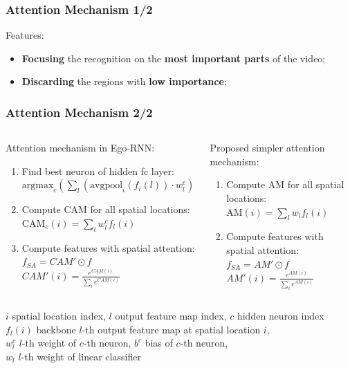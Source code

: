 \documentclass{beamer}
\begin{document}
\begin{frame}
\frametitle{Attention Mechanism 1/2}

Features:
\begin{itemize}
\item \textbf{Focusing} the recognition on the \textbf{most important parts} of the video;
\item \textbf{Discarding} the regions with \textbf{low importance};
\end{itemize}

\end{frame}

\begin{frame}
\frametitle{Attention Mechanism 2/2}

\begin{columns}[t]
	\begin{column}{0.5\textwidth}
		Attention mechanism in Ego-RNN:
		\vspace{6pt}
		{ \scriptsize
		\begin{enumerate}
			\item Find best neuron of hidden fc layer:
			${{\text{argmax}}_c (\sum_l(\text{avgpool}_i(f_i(l)) \cdot w_l^c) + b^c )}$
			\item Compute CAM for all spatial locations: 
			${\text{CAM}_c(i) = \sum_l w_l^c f_l(i)}$
			\item Compute features with spatial attention: \\
			$f_{SA} = CAM' \odot f $ \\ $CAM'(i) =  \frac{e^{CAM(i)}}{\sum_i e^{CAM(i)}}$
		\end{enumerate}
		}
	\end{column} %
	\begin{column}{0.5\textwidth}
		Proposed simpler attention mechanism:
		\vspace{6pt}
		{ \scriptsize
			\begin{enumerate}
				\item Compute AM for all spatial locations: 
				${\text{AM}(i) = \sum_l w_l f_l(i)}$
				\item Compute features with spatial attention: \\
				$f_{SA} = AM' \odot f $ \\ $ AM'(i) =  \frac{e^{AM(i)}}{\sum_i e^{AM(i)}}$
			\end{enumerate}
		}
	\end{column}
\end{columns}

\vfill

{\scriptsize $i$ spatial location index, $l$ output feature map index, $c$ hidden neuron index \\ 
$f_l(i)$ backbone $l$-th output feature map at spatial location $i$, \\
$w_l^c$ $l$-th weight of $c$-th neuron, $b^c$ bias of $c$-th neuron, \\  
\vspace{-4pt}
$w_l$ $l$-th weight of linear classifier}


\end{frame}
\end{document}
